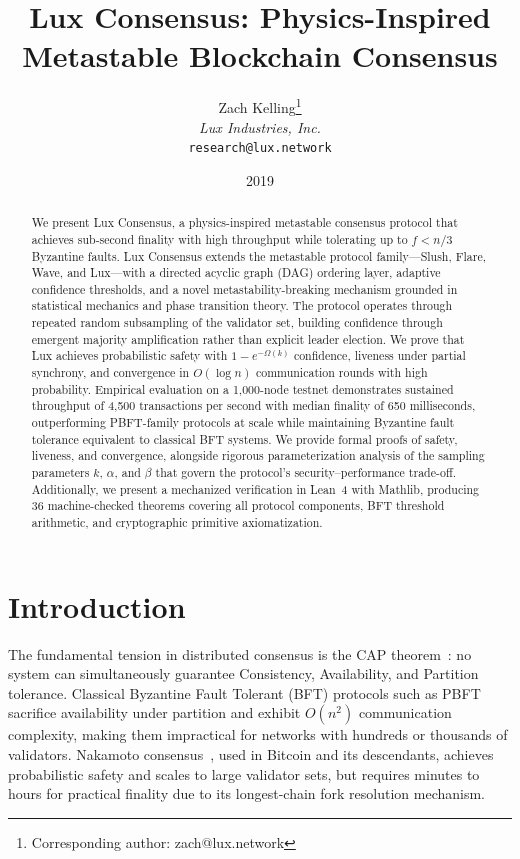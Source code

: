 \documentclass[11pt,a4paper]{article}
\title{\textbf{Lux Consensus: Physics-Inspired Metastable Blockchain Consensus}}
\author{
Zach Kelling\thanks{Corresponding author: zach@lux.network}\\
\textit{Lux Industries, Inc.}\\
\texttt{research@lux.network}
}
\date{2019}
\begin{document}
\luxcoverpage

\begin{abstract}
We present Lux Consensus, a physics-inspired metastable consensus protocol that achieves
sub-second finality with high throughput while tolerating up to $f < n/3$ Byzantine faults.
Lux Consensus extends the metastable protocol family---Slush, Flare, Wave, and
Lux---with a directed acyclic graph (DAG) ordering layer, adaptive confidence
thresholds, and a novel metastability-breaking mechanism grounded in statistical mechanics
and phase transition theory. The protocol operates through repeated random subsampling of
the validator set, building confidence through emergent majority amplification rather than
explicit leader election. We prove that Lux achieves probabilistic safety with $1 - e^{-\Omega(k)}$
confidence, liveness under partial synchrony, and convergence in $O(\log n)$ communication
rounds with high probability. Empirical evaluation on a 1,000-node testnet demonstrates
sustained throughput of 4,500 transactions per second with median finality of 650
milliseconds, outperforming PBFT-family protocols at scale while maintaining Byzantine fault
tolerance equivalent to classical BFT systems. We provide formal proofs of safety, liveness,
and convergence, alongside rigorous parameterization analysis of the sampling parameters
$k$, $\alpha$, and $\beta$ that govern the protocol's security--performance trade-off.
Additionally, we present a mechanized verification in Lean~4 with Mathlib, producing
36 machine-checked theorems covering all protocol components, BFT threshold arithmetic,
and cryptographic primitive axiomatization.
\end{abstract}

\tableofcontents
\newpage

\section{Introduction}
\label{sec:introduction}

The fundamental tension in distributed consensus is the CAP theorem~\cite{brewer2000cap}:
no system can simultaneously guarantee Consistency, Availability, and Partition tolerance.
Classical Byzantine Fault Tolerant (BFT) protocols such as PBFT~\cite{castro1999practical}
sacrifice availability under partition and exhibit $O(n^2)$ communication complexity, making
them impractical for networks with hundreds or thousands of validators.
Nakamoto consensus~\cite{nakamoto2008bitcoin}, used in Bitcoin and its descendants, achieves
probabilistic safety and scales to large validator sets, but requires minutes to hours for
practical finality due to its longest-chain fork resolution mechanism.
\end{document}
